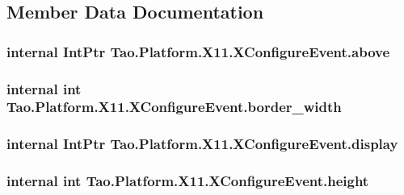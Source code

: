 \subsection{Member Data Documentation}
\hypertarget{struct_tao_1_1_platform_1_1_x11_1_1_x_configure_event_a28393620408ff1eafbf88a18810ef6bc}{
\subsubsection[{above}]{\setlength{\rightskip}{0pt plus 5cm}internal IntPtr {\bf Tao.Platform.X11.XConfigureEvent.above}}}
\label{struct_tao_1_1_platform_1_1_x11_1_1_x_configure_event_a28393620408ff1eafbf88a18810ef6bc}
\hypertarget{struct_tao_1_1_platform_1_1_x11_1_1_x_configure_event_a6c82ce201b6f45df08dae6b5fb1c3ba8}{
\subsubsection[{border\_\-width}]{\setlength{\rightskip}{0pt plus 5cm}internal int {\bf Tao.Platform.X11.XConfigureEvent.border\_\-width}}}
\label{struct_tao_1_1_platform_1_1_x11_1_1_x_configure_event_a6c82ce201b6f45df08dae6b5fb1c3ba8}
\hypertarget{struct_tao_1_1_platform_1_1_x11_1_1_x_configure_event_a8c146c266cb95e10e75174d2d83294cc}{
\subsubsection[{display}]{\setlength{\rightskip}{0pt plus 5cm}internal IntPtr {\bf Tao.Platform.X11.XConfigureEvent.display}}}
\label{struct_tao_1_1_platform_1_1_x11_1_1_x_configure_event_a8c146c266cb95e10e75174d2d83294cc}
\hypertarget{struct_tao_1_1_platform_1_1_x11_1_1_x_configure_event_af68970c4163eddd9f826bc85caf7f581}{
\subsubsection[{height}]{\setlength{\rightskip}{0pt plus 5cm}internal int {\bf Tao.Platform.X11.XConfigureEvent.height}}}

